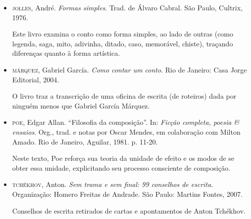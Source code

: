 \documentclass[11pt]{extarticle}
\begin{document}
\begin{itemize}
A autora situa o conto enquanto narrativa, discutindo"-o enquanto um
``gênero'' com características próprias, relatando também seu percurso, de
suas origens remotas e anônimas até sua afirmação com autoria literária.

\item\textsc{jolles}, André. \emph{Formas simples}. Trad. de Álvaro Cabral. São Paulo,
Cultrix, 1976. 

Este livro examina o conto como forma simples, ao
lado de outras (como legenda, saga, mito, adivinha, ditado, caso,
memorável, chiste), traçando diferenças quanto à forma artística.

\item\textsc{márquez}, Gabriel García. \emph{Como contar um conto}. Rio de Janeiro: Casa Jorge Editorial, 2004.

O livro traz a transcrição de uma oficina de escrita (de roteiros) dada por ninguém menos que Gabriel García Márquez.

\item\textsc{poe}, Edgar Allan. ``Filosofia da composição''. In: \emph{Ficção
completa, poesia \& ensaios}. Org., trad. e notas por Oscar Mendes, em
colaboração com Milton Amado. Rio de Janeiro, Aguilar, 1981. p. 11-20.

Neste texto, Poe reforça sua teoria da unidade de efeito e os modos
de se obter essa unidade, explicitando seu processo consciente de
composição.

\item\textsc{tchékhov}, Anton. \emph{Sem trama e sem final: 99 conselhos de escrita}. Organização: Homero Freitas de Andrade.
São Paulo: Martins Fontes, 2007.

Conselhos de escrita retirados de cartas e apontamentos de Anton Tchékhov. 

\end{itemize}
\end{document}

